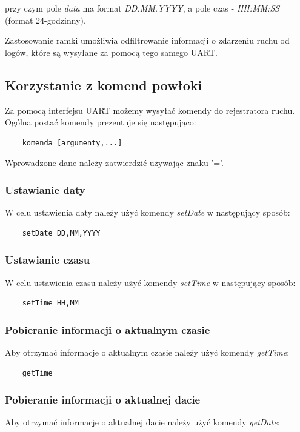 \documentclass{article}
\begin{document}
przy czym pole \emph{data} ma format \emph{DD.MM.YYYY}, a pole czas - \emph{HH:MM:SS} (format 24-godzinny).

Zastosowanie ramki umożliwia odfiltrowanie informacji o zdarzeniu ruchu od logów, które
są wysyłane za pomocą tego samego UART.

\subsection{Korzystanie z komend powłoki}
Za pomocą interfejsu UART możemy wysyłać komendy do rejestratora ruchu. Ogólna postać komendy
prezentuje się następująco:

\begin{lstlisting}
    komenda [argumenty,...]
\end{lstlisting}

Wprowadzone dane należy zatwierdzić używając znaku '='.

\subsubsection{Ustawianie daty}
W celu ustawienia daty należy użyć komendy \emph{setDate} w następujący sposób:

\begin{lstlisting}
    setDate DD,MM,YYYY
\end{lstlisting}

\subsubsection{Ustawianie czasu}
W celu ustawienia czasu należy użyć komendy \emph{setTime} w następujący sposób:

\begin{lstlisting}
    setTime HH,MM
\end{lstlisting}

\subsubsection{Pobieranie informacji o aktualnym czasie}
Aby otrzymać informacje o aktualnym czasie należy użyć komendy \emph{getTime}:

\begin{lstlisting}
    getTime
\end{lstlisting}

\subsubsection{Pobieranie informacji o aktualnej dacie}
Aby otrzymać informacje o aktualnej dacie należy użyć komendy \emph{getDate}:
\end{document}
